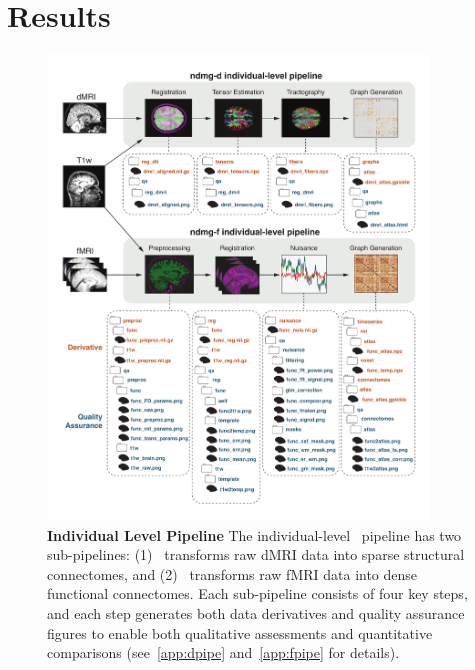 \documentclass[11pt]{article}
\begin{document}
% 



\section{Results}



\begin{figure}[t!]
	\centering
	\includegraphics[width=0.9\textwidth]{./figs/ndmg_pipeline.pdf}
    \caption{\textbf{Individual Level Pipeline}
  The individual-level  \ndmg~pipeline has two sub-pipelines:  (1) \ndmgd~transforms raw dMRI data into sparse structural connectomes, and (2) \ndmgf~transforms raw fMRI data into dense functional connectomes.  Each sub-pipeline consists of four key steps, and each step generates both data derivatives and quality assurance figures to enable both qualitative assessments and quantitative comparisons (see~\ref{app:dpipe} and~\ref{app:fpipe} for details).  
}
	\label{fig:ndmgpipeline}
\end{figure}
\end{document}
